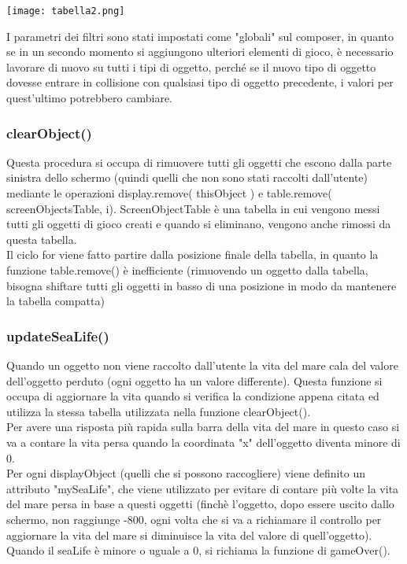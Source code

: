 \documentclass[12pt]{article}
\begin{document}
\begin{center}
    \texttt{[image: tabella2.png]}\\
\end{center}

I parametri dei filtri sono stati impostati come "globali" sul composer, in quanto se in un secondo momento si aggiungono ulteriori 
elementi di gioco, è necessario lavorare di nuovo su tutti i tipi di oggetto, perché se il nuovo tipo di oggetto dovesse entrare in 
collisione con qualsiasi tipo di oggetto precedente, i valori per quest'ultimo potrebbero cambiare. 


\subsubsection{clearObject()}
Questa procedura si occupa di rimuovere tutti gli oggetti che escono dalla parte sinistra dello schermo (quindi quelli che non sono stati raccolti dall'utente) mediante le operazioni display.remove( thisObject ) e table.remove( screenObjectsTable, i). ScreenObjectTable è una tabella in cui vengono messi tutti gli oggetti di gioco creati e quando si eliminano, vengono anche rimossi da questa tabella. \\
Il ciclo for viene fatto partire dalla posizione finale della tabella, in quanto la funzione table.remove() è inefficiente (rimuovendo un oggetto dalla tabella, bisogna shiftare tutti gli oggetti in basso di una posizione in modo da mantenere la tabella compatta)

\subsubsection{updateSeaLife()}
Quando un oggetto non viene raccolto dall'utente la vita del mare cala del valore dell'oggetto perduto (ogni oggetto ha un valore differente). Questa funzione si occupa di aggiornare la vita quando si verifica la condizione appena citata ed utilizza la stessa tabella utilizzata nella funzione clearObject().\\
Per avere una risposta più rapida sulla barra della vita del mare in questo caso si va a contare la vita persa quando la coordinata "x" dell'oggetto diventa minore di 0.\\

Per ogni displayObject (quelli che si possono raccogliere) viene definito un attributo "mySeaLife", che viene utilizzato per evitare di contare più volte la vita del mare persa in base a questi oggetti (finchè l'oggetto, dopo essere uscito dallo schermo, non raggiunge -800, ogni volta che si va a richiamare il controllo per aggiornare la vita del mare si diminuisce la vita del valore di quell'oggetto). Quando il seaLife è minore o uguale a 0, si richiama la funzione di gameOver().\\
\end{document}
